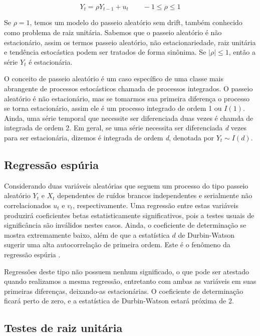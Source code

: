 \documentclass[twocolumn]{rbef}
\newcommand{\1}{\mathbbm{1}}
\begin{document}
\begin{equation} \label{unit_root_eq}
    Y_{t} = \rho Y_{t-1} + u_{t} \qquad -1 \leq \rho \leq 1
\end{equation}

Se $\rho = 1$, temos um modelo do passeio aleatório sem drift, também conhecido como problema de raiz unitária. Sabemos que o passeio aleatório é não estacionário, assim os termos passeio aleatório, não estacionariedade, raiz unitária e tendência estocástica podem ser tratados de forma sinônima. Se $|\rho| \leq 1$, então a série $Y_{t}$ é estacionária.

O conceito de passeio aleatório é um caso específico de uma classe mais abrangente de processos estocásticos chamada de processos integrados. O passeio aleatório é não estacionário, mas se tomarmos sua primeira diferença o processo se torna estacionário, assim ele é um processo integrado de ordem 1 ou $I(1)$. Ainda, uma série temporal que necessite ser diferenciada duas vezes é chamda de integrada de ordem 2. Em geral, se uma série necessita ser diferenciada \textit{d} vezes para ser estacionária, dizemos é integrada de ordem \textit{d}, denotada por $Y_{t} \sim I(d)$.


\subsection{Regressão espúria} \label{spurious}

Considerando duas variáveis aleatórias que seguem um processo do tipo passeio aleatório $Y_{t}$ e $X_{t}$ dependentes de ruídos brancos independentes e serialmente não correlacionados $u_{t}$ e $v_{t}$, respectivamente. Uma regressão entre estas variáveis produzirá coeficientes betas estatisticamente significativos, pois a testes usuais de significância são inválidos nestes casos\cite{Granger-Newbold}. Ainda, o coeficiente de determinação se mostra extremamente baixo, além de que a estatística $d$ de Durbin-Watson sugerir uma alta autocorrelação de primeira ordem\cite{Greene}. Este é o fenômeno da regressão espúria \cite{Yule}.

Regressões deste tipo não possuem nenhum significado, o que pode ser atestado quando realizamos a mesma regressão, entretanto com ambas as variáveis em suas primeiras diferenças, deixando-as estacionárias. O coeficiente de determinação ficará perto de zero, e a estatística de Durbin-Watson estará próxima de 2.

\subsection{Testes de raiz unitária} \label{unit_root}
\end{document}
